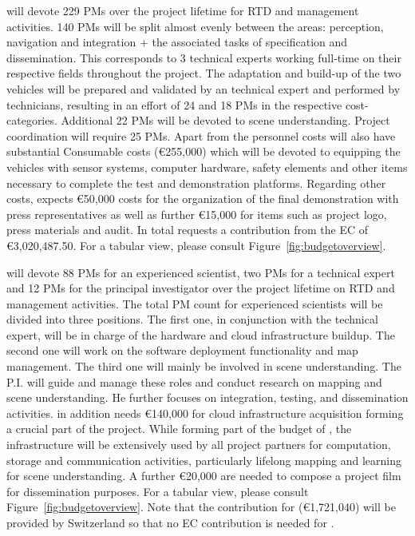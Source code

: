 \VW will devote 229 PMs over the project lifetime for RTD and management activities. 140 PMs will be split almost evenly between the areas: perception, navigation and integration + the associated tasks of specification and dissemination. This corresponds to 3 technical experts working full-time on their respective fields throughout the project. The adaptation and build-up of the two vehicles will be prepared and validated by an technical expert and performed by technicians, resulting in an effort of 24 and 18 PMs in the respective cost-categories. Additional 22 PMs will be devoted to scene understanding. Project coordination will require 25 PMs. Apart from the personnel costs \VW will also have substantial Consumable costs (\euro 255,000) which will be devoted to equipping the vehicles with sensor systems, computer hardware, safety elements and other items necessary to complete the test and demonstration platforms. Regarding other costs, \VW expects \euro 50,000 costs for the organization of the final demonstration with press representatives as well as further \euro 15,000 for items such as project logo, press materials and audit. In total \VW requests a contribution from the EC of \euro 3,020,487.50. For a tabular view, please consult Figure~\ref{fig:budgetoverview}.

\IBM will devote 88 PMs for an experienced scientist, two PMs for a technical expert and 12 PMs for the principal investigator over the project lifetime on RTD and management activities.
The total PM count for experienced scientists will be divided into three positions. The first one, in conjunction with the technical expert, will be in charge of the hardware and cloud infrastructure buildup. The second one will work on the software deployment functionality and map management. The third one will mainly be involved in scene understanding. The P.I. will guide and manage these roles and conduct research on mapping and scene understanding. He further focuses on integration, testing,
and dissemination activities. \IBM in addition needs \euro 140,000 for cloud infrastructure acquisition forming a crucial part of the project. While forming part of the budget of \IBM, the infrastructure will be extensively used by all project partners for computation, storage and communication activities, particularly lifelong mapping and learning for scene understanding. A further \euro 20,000 are needed to compose a project film for dissemination purposes. For a tabular view, please consult Figure~\ref{fig:budgetoverview}. Note that the contribution for \IBM (\euro 1,721,040) will be provided by Switzerland so that no EC contribution is needed for \IBM.


